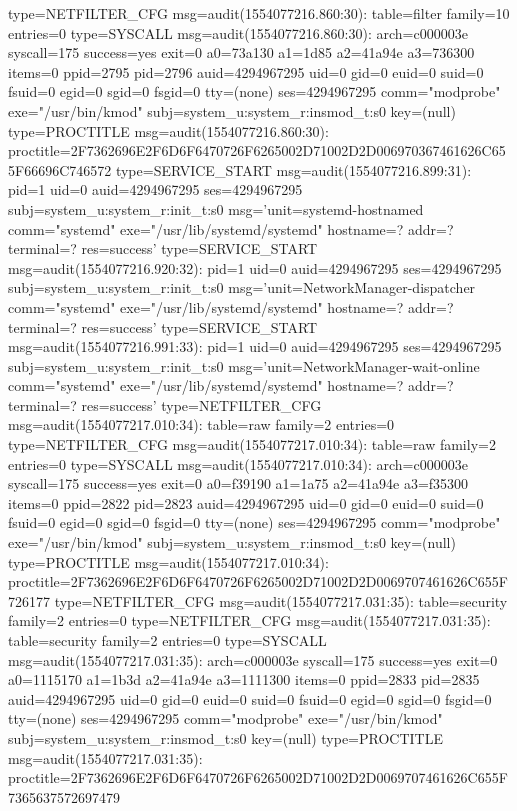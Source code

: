 \documentclass[]{report}
\newenvironment{Shaded}{}{}
\newcommand{\NormalTok}[1]{#1}
\begin{document}
\begin{Shaded}
\begin{Highlighting}[]
\NormalTok{type=NETFILTER_CFG msg=audit(1554077216.860:30): table=filter family=10 entries=0}
\NormalTok{type=SYSCALL msg=audit(1554077216.860:30): arch=c000003e syscall=175 success=yes exit=0 a0=73a130 a1=1d85 a2=41a94e a3=736300 items=0 ppid=2795 pid=2796 auid=4294967295 uid=0 gid=0 euid=0 suid=0 fsuid=0 egid=0 sgid=0 fsgid=0 tty=(none) ses=4294967295 comm="modprobe" exe="/usr/bin/kmod" subj=system_u:system_r:insmod_t:s0 key=(null)}
\NormalTok{type=PROCTITLE msg=audit(1554077216.860:30): proctitle=2F7362696E2F6D6F6470726F6265002D71002D2D006970367461626C655F66696C746572}
\NormalTok{type=SERVICE_START msg=audit(1554077216.899:31): pid=1 uid=0 auid=4294967295 ses=4294967295 subj=system_u:system_r:init_t:s0 msg='unit=systemd-hostnamed comm="systemd" exe="/usr/lib/systemd/systemd" hostname=? addr=? terminal=? res=success'}
\NormalTok{type=SERVICE_START msg=audit(1554077216.920:32): pid=1 uid=0 auid=4294967295 ses=4294967295 subj=system_u:system_r:init_t:s0 msg='unit=NetworkManager-dispatcher comm="systemd" exe="/usr/lib/systemd/systemd" hostname=? addr=? terminal=? res=success'}
\NormalTok{type=SERVICE_START msg=audit(1554077216.991:33): pid=1 uid=0 auid=4294967295 ses=4294967295 subj=system_u:system_r:init_t:s0 msg='unit=NetworkManager-wait-online comm="systemd" exe="/usr/lib/systemd/systemd" hostname=? addr=? terminal=? res=success'}
\NormalTok{type=NETFILTER_CFG msg=audit(1554077217.010:34): table=raw family=2 entries=0}
\NormalTok{type=NETFILTER_CFG msg=audit(1554077217.010:34): table=raw family=2 entries=0}
\NormalTok{type=SYSCALL msg=audit(1554077217.010:34): arch=c000003e syscall=175 success=yes exit=0 a0=f39190 a1=1a75 a2=41a94e a3=f35300 items=0 ppid=2822 pid=2823 auid=4294967295 uid=0 gid=0 euid=0 suid=0 fsuid=0 egid=0 sgid=0 fsgid=0 tty=(none) ses=4294967295 comm="modprobe" exe="/usr/bin/kmod" subj=system_u:system_r:insmod_t:s0 key=(null)}
\NormalTok{type=PROCTITLE msg=audit(1554077217.010:34): proctitle=2F7362696E2F6D6F6470726F6265002D71002D2D0069707461626C655F726177}
\NormalTok{type=NETFILTER_CFG msg=audit(1554077217.031:35): table=security family=2 entries=0}
\NormalTok{type=NETFILTER_CFG msg=audit(1554077217.031:35): table=security family=2 entries=0}
\NormalTok{type=SYSCALL msg=audit(1554077217.031:35): arch=c000003e syscall=175 success=yes exit=0 a0=1115170 a1=1b3d a2=41a94e a3=1111300 items=0 ppid=2833 pid=2835 auid=4294967295 uid=0 gid=0 euid=0 suid=0 fsuid=0 egid=0 sgid=0 fsgid=0 tty=(none) ses=4294967295 comm="modprobe" exe="/usr/bin/kmod" subj=system_u:system_r:insmod_t:s0 key=(null)}
\NormalTok{type=PROCTITLE msg=audit(1554077217.031:35): proctitle=2F7362696E2F6D6F6470726F6265002D71002D2D0069707461626C655F7365637572697479}

\end{Highlighting}
\end{Shaded}
\end{document}
